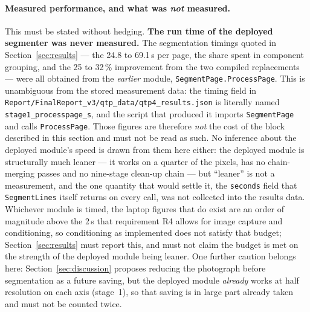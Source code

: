 \paragraph{Measured performance, and what was \emph{not} measured.}
This must be stated without hedging.
\textbf{The run time of the deployed segmenter was never measured.}
The segmentation timings quoted in Section~\ref{sec:results} --- the 24.8 to 69.1\,s per page, the share spent in component grouping, and the 25 to 32\,\% improvement from the two compiled replacements --- were all obtained from the \emph{earlier} module, \texttt{SegmentPage.ProcessPage}.
This is unambiguous from the stored measurement data: the timing field in \texttt{Report/FinalReport\_v3/qtp\_data/qtp4\_results.json} is literally named \texttt{stage1\_processpage\_s}, and the script that produced it imports \texttt{SegmentPage} and calls \texttt{ProcessPage}.
Those figures are therefore \emph{not} the cost of the block described in this section and must not be read as such.
No inference about the deployed module's speed is drawn from them here either: the deployed module is structurally much leaner --- it works on a quarter of the pixels, has no chain-merging passes and no nine-stage clean-up chain --- but ``leaner'' is not a measurement, and the one quantity that would settle it, the \texttt{seconds} field that \texttt{SegmentLines} itself returns on every call, was not collected into the results data.
Whichever module is timed, the laptop figures that do exist are an order of magnitude above the 2\,s that requirement R4 allows for image capture and conditioning, so conditioning as implemented does not satisfy that budget; Section~\ref{sec:results} must report this, and must not claim the budget is met on the strength of the deployed module being leaner.
One further caution belongs here: Section~\ref{sec:discussion} proposes reducing the photograph before segmentation as a future saving, but the deployed module \emph{already} works at half resolution on each axis (stage~1), so that saving is in large part already taken and must not be counted twice.

